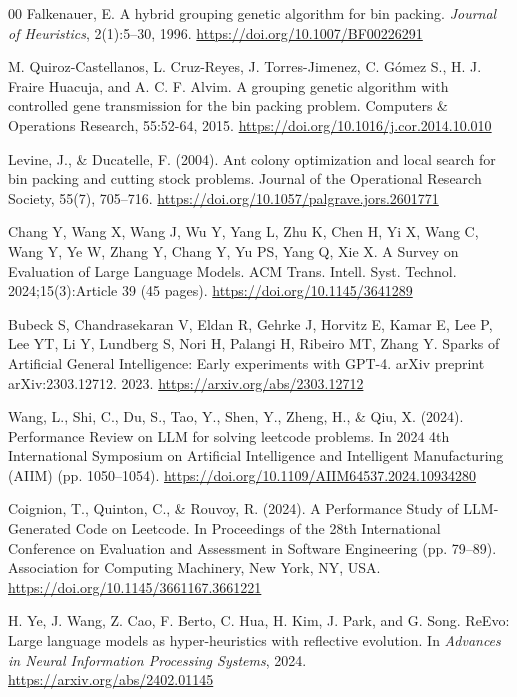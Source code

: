 \documentclass[11pt]{article}
\begin{document}
\begin{thebibliography}{00}
 Falkenauer, E. A hybrid grouping genetic algorithm for bin packing. \textit{Journal of Heuristics}, 2(1):5--30, 1996. \url{https://doi.org/10.1007/BF00226291}

 M. Quiroz-Castellanos, L. Cruz-Reyes, J. Torres-Jimenez, C. Gómez S., H. J. Fraire Huacuja, and A. C. F. Alvim. A grouping genetic algorithm with controlled gene transmission for the bin packing problem. Computers \& Operations Research, 55:52-64, 2015. \url{https://doi.org/10.1016/j.cor.2014.10.010}

 Levine, J., \& Ducatelle, F. (2004). Ant colony optimization and local search for bin packing and cutting stock problems. Journal of the Operational Research Society, 55(7), 705–716. \url{https://doi.org/10.1057/palgrave.jors.2601771}

 Chang Y, Wang X, Wang J, Wu Y, Yang L, Zhu K, Chen H, Yi X, Wang C, Wang Y, Ye W, Zhang Y, Chang Y, Yu PS, Yang Q, Xie X. A Survey on Evaluation of Large Language Models. ACM Trans. Intell. Syst. Technol. 2024;15(3):Article 39 (45 pages). \url{https://doi.org/10.1145/3641289}

 Bubeck S, Chandrasekaran V, Eldan R, Gehrke J, Horvitz E, Kamar E, Lee P, Lee YT, Li Y, Lundberg S, Nori H, Palangi H, Ribeiro MT, Zhang Y. Sparks of Artificial General Intelligence: Early experiments with GPT-4. arXiv preprint arXiv:2303.12712. 2023. \url{https://arxiv.org/abs/2303.12712}

 Wang, L., Shi, C., Du, S., Tao, Y., Shen, Y., Zheng, H., \& Qiu, X. (2024). Performance Review on LLM for solving leetcode problems. In 2024 4th International Symposium on Artificial Intelligence and Intelligent Manufacturing (AIIM) (pp. 1050--1054). \url{https://doi.org/10.1109/AIIM64537.2024.10934280}

 Coignion, T., Quinton, C., \& Rouvoy, R. (2024). A Performance Study of LLM-Generated Code on Leetcode. In Proceedings of the 28th International Conference on Evaluation and Assessment in Software Engineering (pp. 79--89). Association for Computing Machinery, New York, NY, USA. \url{https://doi.org/10.1145/3661167.3661221}

 H. Ye, J. Wang, Z. Cao, F. Berto, C. Hua, H. Kim, J. Park, and G. Song. ReEvo: Large language models as hyper-heuristics with reflective evolution. In \textit{Advances in Neural Information Processing Systems}, 2024. \url{https://arxiv.org/abs/2402.01145}


\end{thebibliography}
\end{document}
